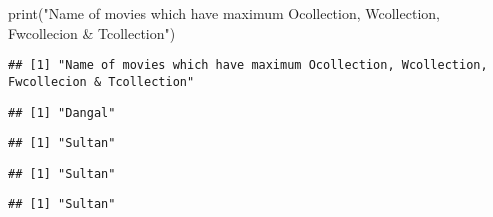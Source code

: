 \documentclass[
]{article}
\newenvironment{Shaded}{\begin{snugshade}}{\end{snugshade}}
\newcommand{\FunctionTok}[1]{\textcolor[rgb]{0.00,0.00,0.00}{#1}}
\newcommand{\NormalTok}[1]{#1}
\newcommand{\SpecialCharTok}[1]{\textcolor[rgb]{0.00,0.00,0.00}{#1}}
\newcommand{\StringTok}[1]{\textcolor[rgb]{0.31,0.60,0.02}{#1}}
\begin{document}
\begin{Shaded}
\begin{Highlighting}[]
\FunctionTok{print}\NormalTok{(}\StringTok{"Name of movies which have maximum Ocollection, Wcollection, Fwcollecion \& Tcollection"}\NormalTok{)}
\end{Highlighting}
\end{Shaded}

\begin{verbatim}
## [1] "Name of movies which have maximum Ocollection, Wcollection, Fwcollecion & Tcollection"
\end{verbatim}

\begin{Shaded}
\end{Shaded}

\begin{verbatim}
## [1] "Dangal"
\end{verbatim}

\begin{Shaded}
\end{Shaded}

\begin{verbatim}
## [1] "Sultan"
\end{verbatim}

\begin{Shaded}
\end{Shaded}

\begin{verbatim}
## [1] "Sultan"
\end{verbatim}

\begin{Shaded}
\end{Shaded}

\begin{verbatim}
## [1] "Sultan"
\end{verbatim}
\end{document}
